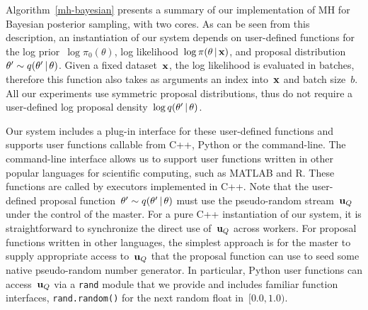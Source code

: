 \documentclass[angelino.tex]{subfiles}
\begin{document}
Algorithm~\ref{mh-bayesian} presents a summary of our implementation of
MH for Bayesian posterior sampling, with two cores.
%
As can be seen from this description,
an instantiation of our system depends on user-defined functions for
the log prior~$\log \pi_0(\theta)$, log likelihood~$\log \pi(\theta \,|\, \mathbf{x})$,
and proposal distribution~${\theta' \sim q(\theta' \,|\, \theta)}$.
%
Given a fixed dataset~$\mathbf{x}$, the log likelihood is evaluated in batches,
therefore this function also takes as arguments an index into~$\mathbf{x}$ and batch size~$b$.
%
All our experiments use symmetric proposal distributions, thus do not require
a user-defined log proposal density~$\log q(\theta' \,|\, \theta)$.


Our system includes a plug-in interface for these user-defined functions
and supports user functions callable from C++, Python or the command-line.
%
The command-line interface allows us to support user functions written in other
popular languages for scientific computing, such as MATLAB and R.
%
These functions are called by executors implemented in C++.
%
Note that the user-defined proposal function~$\theta' \sim q(\theta' \,|\, \theta)$
must use the pseudo-random stream~$\mathbf{u}_Q$ under the control of the master.
%
For a pure C++ instantiation of our system, it is straightforward to
synchronize the direct use of~$\mathbf{u}_Q$ across workers.
%
For proposal functions written in other languages, the simplest approach is for 
the master to supply appropriate access to~$\mathbf{u}_Q$ that the proposal function
can use to seed some native pseudo-random number generator.
%
In particular, Python user functions can access~$\mathbf{u}_Q$ via a \texttt{rand}
module that we provide and includes familiar function interfaces,
\eg \texttt{rand.random()} for the next random float in~$[0.0, 1.0)$.
\end{document}
